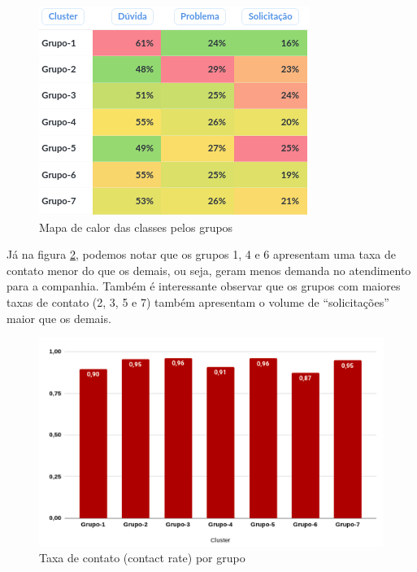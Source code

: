 \documentclass[twocolumn]{rbef}
\newcommand{\1}{\mathbbm{1}}
\begin{document}
\begin{figure}[!htb]
  \centering \includegraphics[scale=0.7]{9. Classificação atendimentos (7 clusters) - table.png}
  \caption{Mapa de calor das classes pelos grupos}
  \label{fig9}
\end{figure}
\newline\linebreak Já na figura \ref{fig10}, podemos notar que os grupos 1, 4 e 6 apresentam uma taxa de contato menor do que os demais, ou seja, geram menos demanda no atendimento para a companhia. Também é interessante observar que os grupos com maiores taxas de contato (2, 3, 5 e 7) também apresentam o volume de “solicitações” maior que os demais.
\begin{figure}[!htb]
  \centering \includegraphics[scale=0.6]{10. Concat rate (7 clusters).png}
  \caption{Taxa de contato (contact rate) por grupo}
  \label{fig10}
\end{figure}
\end{document}
